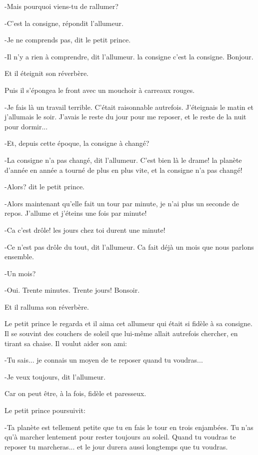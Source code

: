 \documentclass{report}
\begin{document}
\begin{paracol}{2}
-Mais pourquoi viens-tu de rallumer?

-C'est la consigne, répondit l'allumeur.

-Je ne comprends pas, dit le petit prince.

-Il n'y a rien à comprendre, dit l'allumeur. la consigne c'est la consigne. Bonjour.

Et il éteignit son réverbère.

Puis il s'épongea le front avec un mouchoir à carreaux rouges.

-Je fais là un travail terrible. C'était raisonnable autrefois. J'éteignais le matin et j'allumais le soir. J'avais le reste du jour pour me reposer, et le reste de la nuit pour dormir...

-Et, depuis cette époque, la consigne à changé?

-La consigne n'a pas changé, dit l'allumeur. C'est bien là le drame! la planète d'année en année a tourné de plus en plus vite, et la consigne n'a pas changé!

-Alors? dit le petit prince.

-Alors maintenant qu'elle fait un tour par minute, je n'ai plus un seconde de repos. J'allume et j'éteins une fois par minute!

-Ca c'est drôle! les jours chez toi durent une minute!

-Ce n'est pas drôle du tout, dit l'allumeur. Ca fait déjà un mois que nous parlons ensemble.

-Un mois?

-Oui. Trente minutes. Trente jours! Bonsoir.

Et il ralluma son réverbère.

Le petit prince le regarda et il aima cet allumeur qui était si fidèle à sa consigne. Il se souvint des couchers de soleil que lui-même allait autrefois chercher, en tirant sa chaise. Il voulut aider son ami:

-Tu sais... je connais un moyen de te reposer quand tu voudras...

-Je veux toujours, dit l'allumeur.

Car on peut être, à la fois, fidèle et paresseux.

Le petit prince poursuivit:

-Ta planète est tellement petite que tu en fais le tour en trois enjambées. Tu n'as qu'à marcher lentement pour rester toujours au soleil. Quand tu voudras te reposer tu marcheras... et le jour durera aussi longtemps que tu voudras.


\end{paracol}
\end{document}
